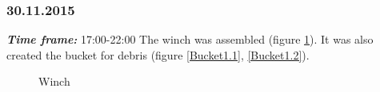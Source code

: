 \subsubsection{30.11.2015}
\textit{\textbf{Time frame:}} 17:00-22:00 \newline
The winch was assembled (figure \ref{Winch1.10}). \newline
It was also created the bucket for debris (figure \ref{Bucket1.1}, \ref{Bucket1.2}).

\begin{figure}[H]
	\begin{minipage}[h]{0.25\linewidth}
		\caption{Winch}
		\label{Winch1.10}
	\end{minipage}
	\hfill
	\begin{minipage}[h]{0.31\linewidth}

\end{minipage}
\end{figure}
